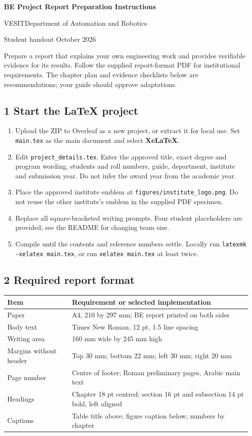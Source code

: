 \documentclass[11pt,a4paper]{article}
\newcommand{\Key}[1]{\textbf{#1}}
\begin{document}
{\Large\bfseries BE Project Report Preparation Instructions}\par
VESIT\quad Department of Automation and Robotics\par
Student handout October 2026

Prepare a report that explains your own engineering work and provides verifiable
evidence for its results. Follow the supplied report-format PDF for institutional
requirements. The chapter plan and evidence checklists below are recommendations;
your guide should approve adaptations.

\subsection*{1 Start the LaTeX project}
\begin{enumerate}
\item Upload the ZIP to Overleaf as a new project, or extract it for local use.
Set \texttt{main.tex} as the main document and select \Key{XeLaTeX}.
\item Edit \texttt{project\_details.tex}. Enter the approved title, exact degree
and program wording, students and roll numbers, guide, department, institute and
submission year. Do not infer the award year from the academic year.
\item Place the approved institute emblem at
\texttt{figures/institute\_logo.png}. Do not reuse the other institute's
emblem in the supplied PDF specimen.
\item Replace all square-bracketed writing prompts. Four student placeholders
are provided; see the README for changing team size.
\item Compile until the contents and reference numbers settle. Locally run
\texttt{latexmk -xelatex main.tex}, or run \texttt{xelatex main.tex} at least twice.
\end{enumerate}

\subsection*{2 Required report format}
\begin{tabularx}{\textwidth}{@{}p{46mm}Y@{}}\toprule
Item & Requirement or selected implementation\\\midrule
Paper & A4, 210 by 297 mm; BE report printed on both sides\\
Body text & Times New Roman, 12 pt, 1.5 line spacing\\
Writing area & 160 mm wide by 245 mm high\\
Margins without header & Top 30 mm; bottom 22 mm; left 30 mm; right 20 mm\\
Page number & Centre of footer; Roman preliminary pages, Arabic main text\\
Headings & Chapter 18 pt centred; section 16 pt and subsection 14 pt bold, left aligned\\
Captions & Table title above; figure caption below; numbers by chapter\\
\bottomrule\end{tabularx}
\end{document}

